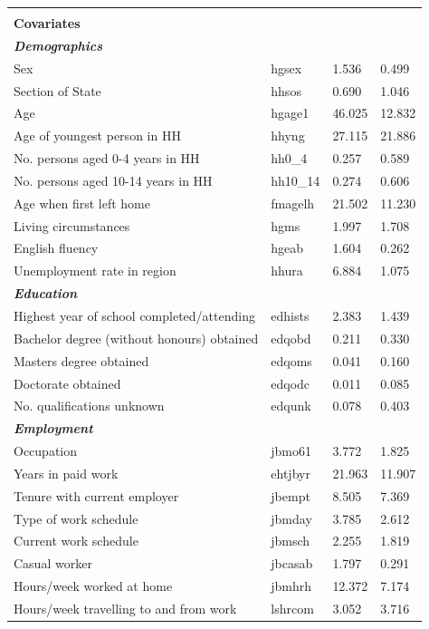 \documentclass[12pt, a4paper]{article}
\begin{document}
\begin{landscape}
\begin{longtable}{p{} C{0.2\textwidth} C{0.2\textwidth} C{0.2\textwidth}}
&  & & \\
\textbf{Covariates} 	& 		 & 		 & 		 \\
\textbf{\textit{Demographics}} 	& 		 & 		 & 		 \\
Sex 	& 	hgsex	 & 	1.536	 & 	0.499	 \\
Section of State 	& 	hhsos	 & 	0.690	 & 	1.046	 \\
Age 	& 	hgage1	 & 	46.025	 & 	12.832	 \\
Age of youngest person in HH 	& 	hhyng	 & 	27.115	 & 	21.886	 \\
No.  persons aged 0-4 years in HH 	& 	hh0\_4	 & 	0.257	 & 	0.589	 \\
No.  persons aged 10-14 years in HH 	& 	hh10\_14	 & 	0.274	 & 	0.606	 \\
Age when first left home 	& 	fmagelh	 & 	21.502	 & 	11.230	 \\
Living circumstances 	& 	hgms	 & 	1.997	 & 	1.708	 \\
English fluency 	& 	hgeab	 & 	1.604	 & 	0.262	 \\
Unemployment rate in region	& 	hhura	 & 	6.884	 & 	1.075	 \\
\textbf{\textit{Education}} 	& 		 & 		 & 		 \\
Highest year of school completed/attending 	& 	edhists	 & 	2.383	 & 	1.439	 \\
Bachelor degree (without honours) obtained 	& 	edqobd	 & 	0.211	 & 	0.330	 \\
Masters degree obtained 	& 	edqoms	 & 	0.041	 & 	0.160	 \\
Doctorate obtained 	& 	edqodc	 & 	0.011	 & 	0.085	 \\
No.  qualifications unknown 	& 	edqunk	 & 	0.078	 & 	0.403	 \\
\textbf{\textit{Employment}} 	& 		 & 		 & 		 \\
Occupation 	& 	jbmo61	 & 	3.772	 & 	1.825	 \\
Years in paid work 	& 	ehtjbyr	 & 	21.963	 & 	11.907	 \\
Tenure with current employer 	& 	jbempt	 & 	8.505	 & 	7.369	 \\
Type of work schedule 	& 	jbmday	 & 	3.785	 & 	2.612	 \\
Current work schedule 	& 	jbmsch	 & 	2.255	 & 	1.819	 \\
Casual worker 	& 	jbcasab	 & 	1.797	 & 	0.291	 \\
Hours/week worked at home 	& 	jbmhrh	 & 	12.372	 & 	7.174	 \\
Hours/week travelling to and from work 	& 	lshrcom	 & 	3.052	 & 	3.716	 \\

\end{longtable}
\end{landscape}
\end{document}
